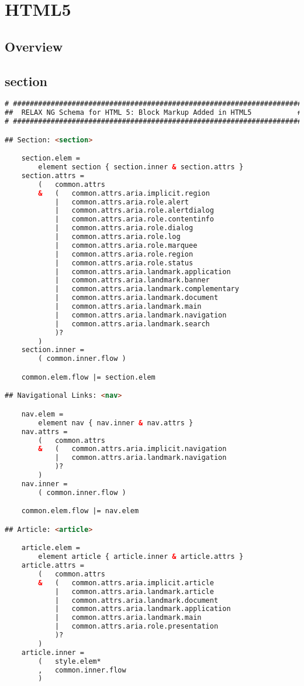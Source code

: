 \part{HTML5}

\chapter{Overview}


\chapter{section}


\begin{lstlisting}[language=HTML]
# #####################################################################
##  RELAX NG Schema for HTML 5: Block Markup Added in HTML5           #
# #####################################################################

## Section: <section>

	section.elem =
		element section { section.inner & section.attrs }
	section.attrs =
		(	common.attrs
		&	(	common.attrs.aria.implicit.region
			|	common.attrs.aria.role.alert
			|	common.attrs.aria.role.alertdialog
			|	common.attrs.aria.role.contentinfo
			|	common.attrs.aria.role.dialog
			|	common.attrs.aria.role.log
			|	common.attrs.aria.role.marquee
			|	common.attrs.aria.role.region
			|	common.attrs.aria.role.status
			|	common.attrs.aria.landmark.application
			|	common.attrs.aria.landmark.banner
			|	common.attrs.aria.landmark.complementary
			|	common.attrs.aria.landmark.document
			|	common.attrs.aria.landmark.main
			|	common.attrs.aria.landmark.navigation
			|	common.attrs.aria.landmark.search
			)?
		)
	section.inner =
		( common.inner.flow )

	common.elem.flow |= section.elem

## Navigational Links: <nav>

	nav.elem =
		element nav { nav.inner & nav.attrs }
	nav.attrs =
		(	common.attrs
		&	(	common.attrs.aria.implicit.navigation
			|	common.attrs.aria.landmark.navigation
			)?
		)
	nav.inner =
		( common.inner.flow )

	common.elem.flow |= nav.elem

## Article: <article>

	article.elem =
		element article { article.inner & article.attrs }
	article.attrs =
		(	common.attrs
		&	(	common.attrs.aria.implicit.article
			|	common.attrs.aria.landmark.article
			|	common.attrs.aria.landmark.document
			|	common.attrs.aria.landmark.application
			|	common.attrs.aria.landmark.main
			|	common.attrs.aria.role.presentation
			)?
		)
	article.inner =
		(	style.elem*
		,	common.inner.flow 
		)
		

\end{lstlisting}
